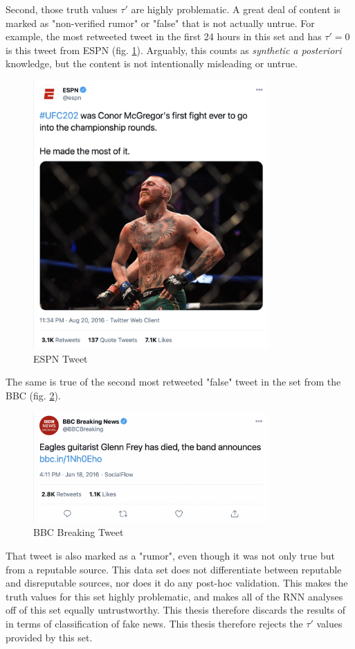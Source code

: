\documentclass[preprint,review,12pt]{elsarticle}
\begin{document}
Second, those truth values $\tau'$ are highly problematic. A great deal of content is marked as "non-verified rumor" or "false" that is not actually untrue. For example, the most retweeted tweet in the first 24 hours in this set and has $\tau' = 0$ is this tweet from ESPN (fig. \ref{fig:ESPN Tweet, April 20, 2016}). Arguably, this counts as \textit{synthetic a posteriori} knowledge, but the content is not intentionally misleading or untrue. 
 \begin{figure}[h!]
    \centering
    \includegraphics[width=9cm]{espn Mcgregor tweet.png}
    \caption{ESPN Tweet}
    \label{fig:ESPN Tweet, April 20, 2016}
\end{figure}

The same is true of the second most retweeted "false" tweet in the set from the BBC (fig. \ref{fig:BBC Breaking Tweet, Jan 18, 2016}).
\begin{figure}[h!]
    \centering
    \includegraphics[width=9cm]{BBC Eagles.png}
    \caption{BBC Breaking Tweet}
    \label{fig:BBC Breaking Tweet, Jan 18, 2016}
\end{figure}
That tweet is also marked as a "rumor", even though it was not only true but from a reputable source. This data set does not differentiate between reputable and disreputable sources, nor does it do any post-hoc validation. This makes the truth values for this set highly problematic, and makes all of the RNN analyses off of this set equally untrustworthy. This thesis therefore discards the results of \citep{liu2018early,ma2017detect,ma2016detecting,khoo2020interpretable,liu2019early,huang2019deep} in terms of classification of fake news. This thesis therefore rejects the $\tau'$ values provided by this set.
\end{document}
